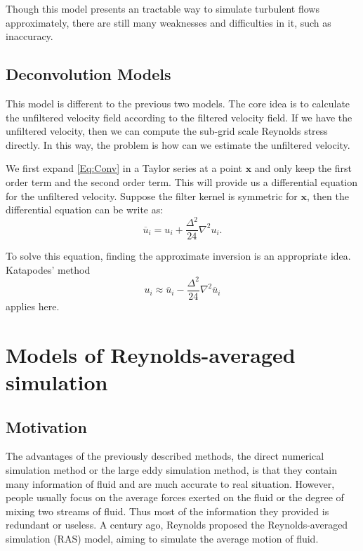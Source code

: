 \documentclass[english, nochinese]{pkupaper}
\begin{document}
Though this model presents an tractable way to simulate turbulent flows approximately, there are still many weaknesses and difficulties in it, such as inaccuracy.

\subsection{Deconvolution Models}

This model is different to the previous two models. The core idea is to calculate the unfiltered velocity field according to the filtered velocity field. If we have the unfiltered velocity, then we can compute the sub-grid scale Reynolds stress directly. In this way, the problem is how can we estimate the unfiltered velocity.

We first expand \eqref{Eq:Conv} in a Taylor series at a point $\mathbf{x}$ and only keep the first order term and the second order term. This will provide us a differential equation for the unfiltered velocity. Suppose the filter kernel is symmetric for $\mathbf{x}$, then the differential equation can be write as:
\begin{equation}
\overline{u}_i = u_i + \frac{\Delta^2}{24}\nabla^2u_i.
\end{equation}

To solve this equation, finding the approximate inversion is an appropriate idea. Katapodes' method
\begin{equation}
u_i \approx \overline{u}_i - \frac{\Delta^2}{24}\nabla^2\overline{u}_i
\end{equation}
applies here.

\section{Models of Reynolds-averaged simulation} \label{Sec:RAS}

\subsection{Motivation}

The advantages of the previously described methods, the direct numerical simulation method or the large eddy simulation method, is that they contain many information of fluid and are much accurate to real situation. However, people usually focus on the average forces exerted on the fluid or the degree of mixing two streams of fluid. Thus most of the information they provided is redundant or useless. A century ago, Reynolds proposed the Reynolds-averaged simulation (RAS) model, aiming to simulate the average motion of fluid.
\end{document}
